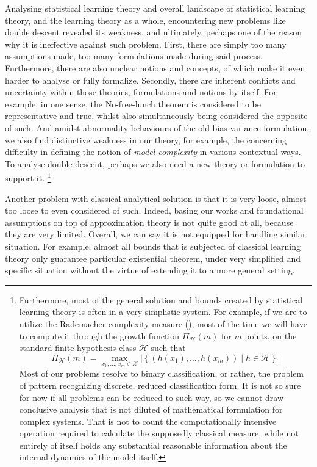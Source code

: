\documentclass{article}
\begin{document}
Analysing statistical learning theory and overall landscape of statistical learning theory, and the learning theory as a whole, encountering new problems like double descent revealed its weakness, and ultimately, perhaps one of the reason why it is ineffective against such problem. First, there are simply too many assumptions made, too many formulations made during said process. Furthermore, there are also unclear notions and concepts, of which make it even harder to analyse or fully formalize. Secondly, there are inherent conflicts and uncertainty within those theories, formulations and notions by itself. For example, in one sense, the No-free-lunch theorem is considered to be representative and true, whilst also simultaneously being considered the opposite of such. And amidst abnormality behaviours of the old bias-variance formulation, we also find distinctive weakness in our theory, for example, the concerning difficulty in defining the notion of \textit{model complexity} in various contextual ways. To analyse double descent, perhaps we also need a new theory or formulation to support it. \footnote{Furthermore, most of the general solution and bounds created by statistical learning theory is often in a very simplistic system. For example, if we are to utilize the Rademacher complexity measure (\cite{10.5555/2371238}), most of the time we will have to compute it through the growth function $\Pi_{\mathcal{H}}(m)$ for $m$ points, on the standard finite hypothesis class $\mathcal{H}$ such that 
\begin{equation}
    \Pi_{\mathcal{H}}(m) = \max_{x_1, \dots, x_m \in \mathcal{X}} \left| \left\{ (h(x_1), \dots, h(x_m)) \mid h \in \mathcal{H} \right\} \right|
\end{equation}
Most of our problems resolve to binary classification, or rather, the problem of pattern recognizing discrete, reduced classification form. It is not so sure for now if all problems can be reduced to such way, so we cannot draw conclusive analysis that is not diluted of mathematical formulation for complex systems. That is not to count the computationally intensive operation required to calculate the supposedly classical measure, while not entirely of itself holds any substantial reasonable information about the internal dynamics of the model itself. }

Another problem with classical analytical solution is that it is very loose, almost too loose to even considered of such. Indeed, basing our works and foundational assumptions on top of approximation theory is not quite good at all, because they are very limited. Overall, we can say it is not equipped for handling similar situation. For example, almost all bounds that is subjected of classical learning theory only guarantee particular existential theorem, under very simplified and specific situation without the virtue of extending it to a more general setting. 
\end{document}
